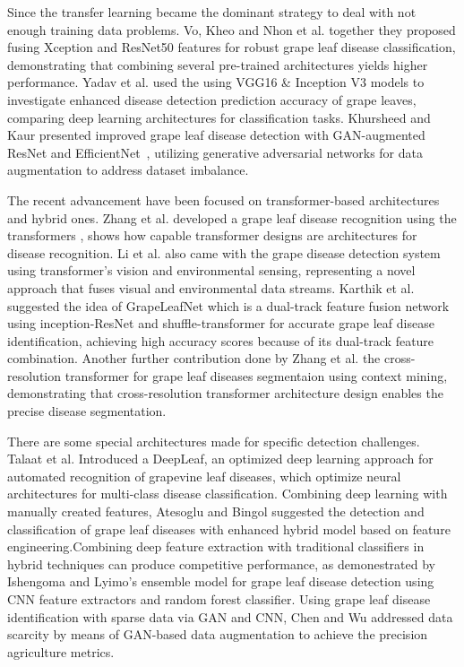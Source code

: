 Since the transfer learning became the dominant strategy to deal with not enough training data problems. Vo, Kheo and Nhon et al. together they proposed fusing Xception and ResNet50 features for robust grape leaf disease classification\cite{vo2025fusing}, demonstrating that combining several pre-trained architectures yields higher performance. Yadav et al. used the using VGG16 \& Inception V3 models to investigate enhanced disease detection prediction accuracy of grape leaves\cite{yadav2025enhancing}, comparing deep learning architectures for classification tasks. Khursheed and Kaur presented improved grape leaf disease detection with GAN-augmented ResNet and EfficientNet~\cite{khursheed2025improved}, utilizing generative adversarial networks for data augmentation to address dataset imbalance.


The recent advancement have been focused on transformer-based architectures and hybrid ones. Zhang et al. developed a grape leaf disease recognition using the transformers \cite{zhang2025lightweight}, shows how capable transformer designs are architectures for disease recognition. Li et al. also came with the grape disease detection system using transformer's vision and environmental sensing\cite{li2025grape}, representing a novel approach that fuses visual and environmental data streams. Karthik et al. suggested the idea of GrapeLeafNet which is a dual-track feature fusion network using inception-ResNet and shuffle-transformer for accurate grape leaf disease identification\cite{karthik2024grapeleafnet}, achieving high accuracy scores because of its dual-track feature combination. Another further contribution done by Zhang et al. the cross-resolution transformer for grape leaf diseases segmentaion using context mining\cite{zhang2023crformer}, demonstrating that cross-resolution transformer architecture design enables the precise disease segmentation.


There are some special architectures made for specific detection challenges. Talaat et al. Introduced a DeepLeaf, an optimized deep learning approach for automated recognition of grapevine leaf diseases\cite{talaat2025deepleaf}, which optimize neural architectures for multi-class disease classification. Combining deep learning with manually created features, Atesoglu and Bingol suggested the detection and classification of grape leaf diseases with enhanced hybrid model based on feature engineering\cite{atesoglu2025detection}.Combining deep feature extraction with traditional classifiers in hybrid techniques can produce competitive performance, as demonestrated by Ishengoma and Lyimo's ensemble model for grape leaf disease detection using CNN feature extractors and random forest classifier\cite{ishengoma2024ensemble}. Using grape leaf disease identification with sparse data via GAN and CNN, Chen and Wu addressed data scarcity by means of GAN-based data augmentation to achieve the precision agriculture metrics\cite{chen2023grape}.

